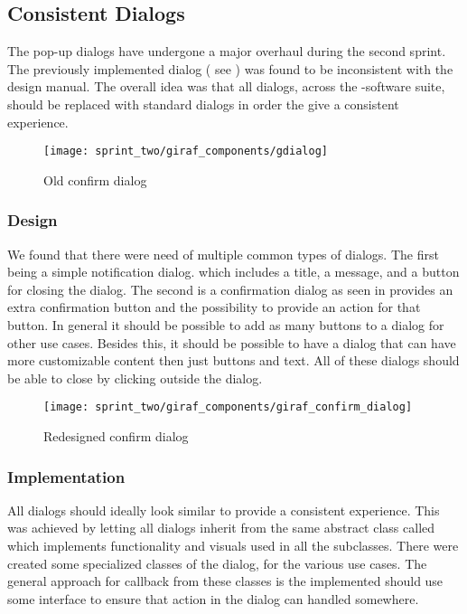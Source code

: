 \subsection{Consistent Dialogs}
\label{sec:consistent_dialogs}


The pop-up dialogs have undergone a major overhaul during the second sprint. The previously implemented dialog ( see ) was found to be inconsistent with the \giraf design manual. The overall idea was that all dialogs, across the \giraf-software suite, should be replaced with standard dialogs in order the give a consistent experience. 

\begin{figure}[!htbp]
    \centering
    \texttt{[image: sprint\_two/giraf\_components/gdialog]}
    \caption{Old confirm dialog}
    \label{fig:gdialog}
\end{figure}


\subsubsection{Design}
We found that there were need of multiple common types of dialogs. The first being a simple notification dialog. which includes a title, a message, and a button for closing the dialog. The second is a confirmation dialog as seen in  provides an extra confirmation button and the possibility to provide an action for that button. In general it should be possible to add as many buttons to a dialog for other use cases. Besides this, it should be possible to have a dialog that can have more customizable content then just buttons and text. All of these dialogs should be able to close by clicking outside the dialog.

\begin{figure}[!htbp]
    \centering
    \texttt{[image: sprint\_two/giraf\_components/giraf\_confirm\_dialog]}
    \caption{Redesigned confirm dialog}
    \label{fig:giraf_confirm_dialog}
\end{figure}

\subsubsection{Implementation}

All dialogs should ideally look similar to provide a consistent experience. This was achieved by letting all dialogs inherit from the same abstract class called  which implements functionality and visuals used in all the subclasses. There were created some specialized classes of the dialog, for the various use cases. The general approach for callback from these classes is the implemented should use some interface to ensure that action in the dialog can handled somewhere.

